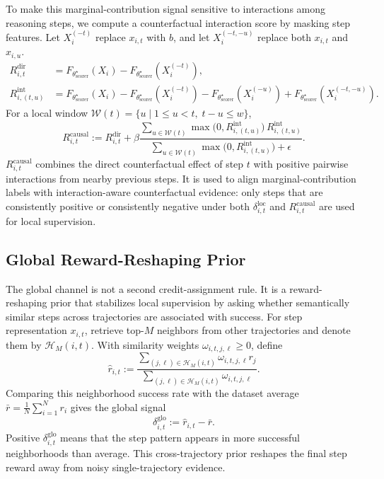 To make this marginal-contribution signal sensitive to interactions among
reasoning steps, we compute a counterfactual interaction score by masking step
features.
Let \(X_i^{(-t)}\) replace \(x_{i,t}\) with \(b\), and let
\(X_i^{(-t,-u)}\) replace both \(x_{i,t}\) and \(x_{i,u}\).
\begin{align}
\label{eq:direct_counterfactual}
R_{i,t}^{\mathrm{dir}}
&=
F_{\theta_{\mathrm{scorer}}^\star}(X_i)
-
F_{\theta_{\mathrm{scorer}}^\star}(X_i^{(-t)}), \\
\label{eq:pairwise_interaction}
R_{i,(t,u)}^{\mathrm{int}}
&=
F_{\theta_{\mathrm{scorer}}^\star}(X_i)
-
F_{\theta_{\mathrm{scorer}}^\star}(X_i^{(-t)})
-
F_{\theta_{\mathrm{scorer}}^\star}(X_i^{(-u)})
+
F_{\theta_{\mathrm{scorer}}^\star}(X_i^{(-t,-u)}).
\end{align}
For a local window
\(\mathcal{W}(t)=\{u \mid 1 \le u < t,\; t-u \le w\}\),
\begin{equation}
\label{eq:pairwise_counterfactual}
R_{i,t}^{\mathrm{causal}}
:=
R_{i,t}^{\mathrm{dir}}
+
\beta
\frac{
\sum_{u\in\mathcal{W}(t)} \max\!\big(0, R_{i,(t,u)}^{\mathrm{int}}\big)\,
R_{i,(t,u)}^{\mathrm{int}}
}{
\sum_{u\in\mathcal{W}(t)} \max\!\big(0, R_{i,(t,u)}^{\mathrm{int}}\big)
+ \epsilon
}.
\end{equation}
\(R_{i,t}^{\mathrm{causal}}\) combines the direct counterfactual effect of step
\(t\) with positive pairwise interactions from nearby previous steps.
It is used to align marginal-contribution labels with interaction-aware
counterfactual evidence: only steps that are consistently positive or
consistently negative under both \(\delta_{i,t}^{\mathrm{loc}}\) and
\(R_{i,t}^{\mathrm{causal}}\) are used for local supervision.

\subsection{Global Reward-Reshaping Prior}
\label{sec:method_global}

The global channel is not a second credit-assignment rule.
It is a reward-reshaping prior that stabilizes local supervision by asking
whether semantically similar steps across trajectories are associated with
success.
For step representation \(x_{i,t}\), retrieve top-\(M\) neighbors from other
trajectories and denote them by \(\mathcal{H}_M(i,t)\).
With similarity weights \(\omega_{i,t,j,\ell}\ge 0\), define
\[
\hat r_{i,t}
:=
\frac{
\sum_{(j,\ell)\in\mathcal{H}_M(i,t)} \omega_{i,t,j,\ell} r_j
}{
\sum_{(j,\ell)\in\mathcal{H}_M(i,t)} \omega_{i,t,j,\ell}
}.
\]
Comparing this neighborhood success rate with the dataset average
\(
\bar r=\frac{1}{N}\sum_{i=1}^{N} r_i
\)
gives the global signal
\begin{equation}
\label{eq:delta_global}
\delta_{i,t}^{\mathrm{glo}}
:=
\hat r_{i,t}-\bar r .
\end{equation}
Positive \(\delta_{i,t}^{\mathrm{glo}}\) means that the step pattern appears in
more successful neighborhoods than average.
This cross-trajectory prior reshapes the final step reward away from noisy
single-trajectory evidence.

